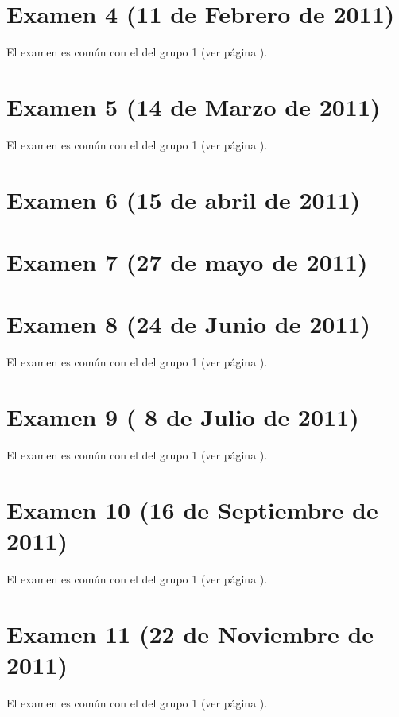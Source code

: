 \documentclass[a4paper,12pt,twoside]{book}
\begin{document}
\section{Examen 4 (11 de Febrero de 2011)}
El examen es común con el del grupo 1 (ver página \pageref{examen_10_11_1_4}).
\section{Examen 5 (14 de Marzo de 2011)} 
El examen es común con el del grupo 1 (ver página \pageref{examen_10_11_1_5}).
\section{Examen 6 (15 de abril de 2011)}
\section{Examen 7 (27 de mayo de 2011)} 
\section{Examen 8 (24 de Junio de 2011)} 
El examen es común con el del grupo 1 (ver página \pageref{examen_10_11_1_8}).
\section{Examen 9 ( 8 de Julio de 2011)} 
El examen es común con el del grupo 1 (ver página \pageref{examen_10_11_1_9}).
\section{Examen 10 (16 de Septiembre de 2011)} 
El examen es común con el del grupo 1 (ver página \pageref{examen_10_11_1_10}).
\section{Examen 11 (22 de Noviembre de 2011)} 
El examen es común con el del grupo 1 (ver página \pageref{examen_10_11_1_11}).

\appendix %






\nocite{Alonso-12b}
\nocite{Bird-99a}
\nocite{Cunningham-10a}
\nocite{Daume-06}
\nocite{Davie-92a}
\nocite{Doets-04a}
\nocite{Fokker-96}
\nocite{Hudak-00a}
\nocite{Hudak-12a}
\nocite{Hutton-07a}
\nocite{OSullivan-08a}
\nocite{Rabhi-99a}
\nocite{Polya-65a}
\nocite{Ruiz-04}
\nocite{Thompson-11a}



\end{document}
